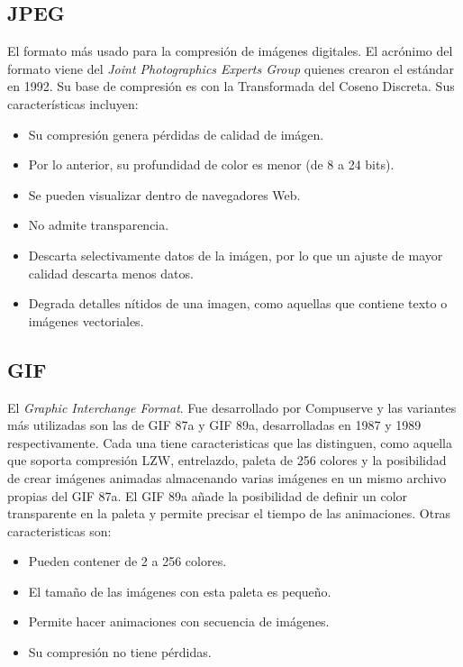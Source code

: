 \documentclass[letterpaper, 12pt]{article}
\begin{document}
    \subsection*{JPEG}
    El formato más usado para la compresión de imágenes digitales. El acrónimo del formato viene del \emph{Joint Photographics Experts Group} quienes crearon el estándar en 1992.
    Su base de compresión es con la Transformada del Coseno Discreta. Sus características incluyen:
    \begin{itemize}
        \item Su compresión genera pérdidas de calidad de imágen.
        \item Por lo anterior, su profundidad de color es menor (de 8 a 24 bits).
        \item Se pueden visualizar dentro de navegadores Web.
        \item No admite transparencia.
        \item Descarta selectivamente datos de la imágen, por lo que un ajuste de mayor calidad descarta menos datos.
        \item Degrada detalles nítidos de una imagen, como aquellas que contiene texto o imágenes vectoriales.
    \end{itemize}\par
    \vspace{\baselineskip}
    \subsection*{GIF}
    El \emph{Graphic Interchange Format}. Fue desarrollado por Compuserve y las variantes más utilizadas son las de GIF 87a y GIF 89a, desarrolladas en 1987 y 1989 respectivamente.
    Cada una tiene caracteristicas que las distinguen, como aquella que soporta compresión LZW, entrelazdo, paleta de 256 colores y la posibilidad de crear imágenes animadas almacenando varias
    imágenes en un mismo archivo propias del GIF 87a. El GIF 89a añade la posibilidad de definir un color transparente en la paleta y permite precisar el tiempo de las animaciones. Otras caracteristicas son:
    \begin{itemize}
        \item Pueden contener de 2 a 256 colores.
        \item El tamaño de las imágenes con esta paleta es pequeño.
        \item Permite hacer animaciones con secuencia de imágenes.
        \item Su compresión no tiene pérdidas.
    \end{itemize}\par
    \vspace{\baselineskip}
\end{document}
